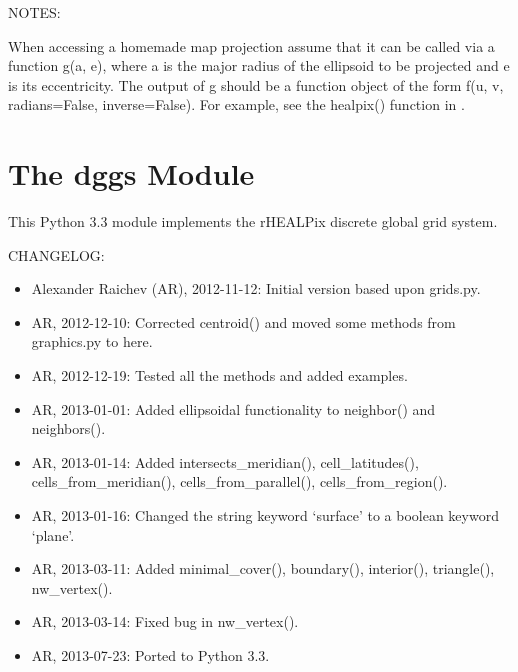 \documentclass[a4paper,12ptopenany,oneside]{sphinxmanual}
\begin{document}
\begin{fulllineitems}
NOTES:

When accessing a homemade map projection assume that it can be called via
a function g(a, e), where a is the major radius of the ellipsoid to be 
projected and e is its eccentricity.
The output of g should be a function object of the form 
f(u, v, radians=False, inverse=False).
For example, see the healpix() function in .

\end{fulllineitems}



\chapter{The dggs Module}
\label{dggs:the-dggs-module}\label{dggs::doc}\label{dggs:module-rhealpix_dggs.dggs}
This Python 3.3 module implements the rHEALPix discrete global grid system.

CHANGELOG:
\begin{itemize}
\item {} 
Alexander Raichev (AR), 2012-11-12: Initial version based upon grids.py.

\item {} 
AR, 2012-12-10: Corrected centroid() and moved some methods from graphics.py to here.

\item {} 
AR, 2012-12-19: Tested all the methods and added examples.

\item {} 
AR, 2013-01-01: Added ellipsoidal functionality to neighbor() and neighbors().

\item {} 
AR, 2013-01-14: Added intersects\_meridian(), cell\_latitudes(), cells\_from\_meridian(), cells\_from\_parallel(), cells\_from\_region().

\item {} 
AR, 2013-01-16: Changed the string keyword `surface' to a boolean keyword `plane'.

\item {} 
AR, 2013-03-11: Added minimal\_cover(), boundary(), interior(), triangle(), nw\_vertex().

\item {} 
AR, 2013-03-14: Fixed bug in nw\_vertex().

\item {} 
AR, 2013-07-23: Ported to Python 3.3.

\end{itemize}
\end{document}
